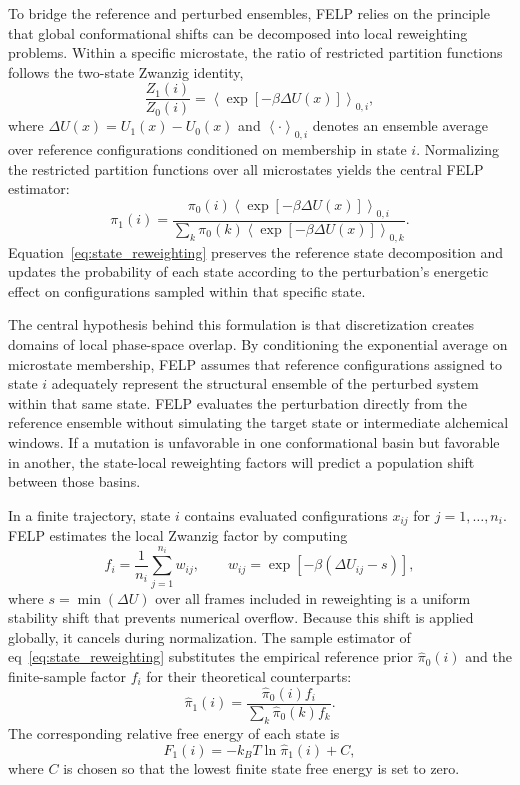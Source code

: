 \documentclass[journal=jctcce,manuscript=article,layout=twocolumn,hyperref=true]{achemso}
\newcommand{\eqnref}[1]{eq~\ref{#1}}
\begin{document}
	To bridge the reference and perturbed ensembles, FELP relies on the principle that global conformational shifts can be decomposed into local reweighting problems. Within a specific microstate, the ratio of restricted partition functions follows the two-state Zwanzig identity,
\begin{equation}
		\frac{Z_1(i)}{Z_0(i)}
		=
		\left\langle \exp[-\beta \Delta U(x)] \right\rangle_{0,i},
		\label{eq:restricted_zwanzig}
\end{equation}
	where $\Delta U(x)=U_1(x)-U_0(x)$ and $\left\langle \cdot \right\rangle_{0,i}$ denotes an ensemble average over reference configurations conditioned on membership in state $i$. Normalizing the restricted partition functions over all microstates yields the central FELP estimator:
\begin{equation}
		\pi_1(i) =
		\frac{\pi_0(i)\left\langle \exp[-\beta \Delta U(x)] \right\rangle_{0,i}}
		{\sum_k \pi_0(k)\left\langle \exp[-\beta \Delta U(x)] \right\rangle_{0,k}}.
	\label{eq:state_reweighting}
\end{equation}
	Equation~\ref{eq:state_reweighting} preserves the reference state decomposition and updates the probability of each state according to the perturbation's energetic effect on configurations sampled within that specific state.
	
	The central hypothesis behind this formulation is that discretization creates domains of local phase-space overlap. By conditioning the exponential average on microstate membership, FELP assumes that reference configurations assigned to state $i$ adequately represent the structural ensemble of the perturbed system within that same state. FELP evaluates the perturbation directly from the reference ensemble without simulating the target state or intermediate alchemical windows. If a mutation is unfavorable in one conformational basin but favorable in another, the state-local reweighting factors will predict a population shift between those basins.
	
	In a finite trajectory, state $i$ contains evaluated configurations $x_{ij}$ for $j=1,\ldots,n_i$. FELP estimates the local Zwanzig factor by computing
	\begin{equation}
		f_i = \frac{1}{n_i}\sum_{j=1}^{n_i} w_{ij},
		\qquad
		w_{ij}=\exp[-\beta(\Delta U_{ij}-s)],
	\end{equation}
	where $s=\min(\Delta U)$ over all frames included in reweighting is a uniform stability shift that prevents numerical overflow. Because this shift is applied globally, it cancels during normalization. The sample estimator of \eqnref{eq:state_reweighting} substitutes the empirical reference prior $\hat{\pi}_0(i)$ and the finite-sample factor $f_i$ for their theoretical counterparts:
	\begin{equation}
		\hat{\pi}_1(i) =
		\frac{\hat{\pi}_0(i) f_i}
		{\sum_k \hat{\pi}_0(k) f_k}.
		\label{eq:sample_reweighting}
	\end{equation}
	The corresponding relative free energy of each state is
	\begin{equation}
		F_1(i) = -k_B T \ln \hat{\pi}_1(i) + C,
	\end{equation}
	where $C$ is chosen so that the lowest finite state free energy is set to zero.
	
\end{document}

